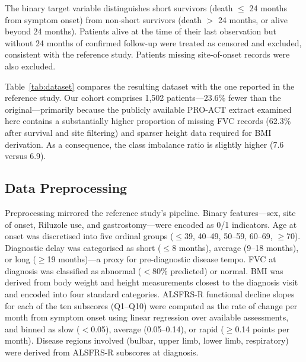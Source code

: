 \documentclass[a4paper,twoside]{article}
\begin{document}
The binary target variable distinguishes short survivors (death $\leq$ 24 months
from symptom onset) from non-short survivors (death $>$ 24 months, or alive
beyond 24 months). Patients alive at the time of their last observation but
without 24 months of confirmed follow-up were treated as censored and excluded,
consistent with the reference study. Patients missing site-of-onset records were
also excluded.

Table~\ref{tab:dataset} compares the resulting dataset with the one reported in
the reference study. Our cohort comprises 1,502 patients---23.6\% fewer than the
original---primarily because the publicly available PRO-ACT extract examined
here contains a substantially higher proportion of missing FVC records (62.3\%
after survival and site filtering) and sparser height data required for BMI
derivation. As a consequence, the class imbalance ratio is slightly higher (7.6
versus 6.9).

\begin{table}[ht!]
  \centering
  \caption{Dataset comparison between the reference study~\protect\cite{Papaiz2024} and this work.}
  \label{tab:dataset}
\end{table}

\subsection{Data Preprocessing}

Preprocessing mirrored the reference study's pipeline. Binary features---sex,
site of onset, Riluzole use, and gastrostomy---were encoded as 0/1 indicators.
Age at onset was discretised into five ordinal groups ($\leq$39, 40--49, 50--59,
60--69, $\geq$70). Diagnostic delay was categorised as short ($\leq$8 months),
average (9--18 months), or long ($\geq$19 months)---a proxy for pre-diagnostic
disease tempo. FVC at diagnosis was classified as abnormal ($<$80\% predicted) or
normal. BMI was derived from body weight and height measurements closest to the
diagnosis visit and encoded into four standard categories. ALSFRS-R functional
decline slopes for each of the ten subscores (Q1--Q10) were computed as the
rate of change per month from symptom onset using linear regression over
available assessments, and binned as slow ($<$0.05), average (0.05--0.14), or
rapid ($\geq$0.14 points per month). Disease regions involved
(bulbar, upper limb, lower limb, respiratory) were derived from ALSFRS-R
subscores at diagnosis.
\end{document}
